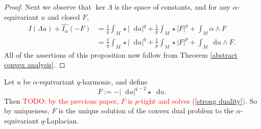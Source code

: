 \documentclass[reqno,11pt]{amsart}
\newcommand{\RR}{\mathbf{R}}
\newcommand{\Torus}{\mathbf T}
\newcommand*\dif{\mathop{}\!\mathrm{d}}
\theoremstyle{definition}
\newtheorem{definition}[theorem]{Definition}
\numberwithin{equation}{section}
\newcommand\todo[1]{\textcolor{red}{TODO: #1}}
\begin{document}
\begin{proof}
Next we observe that $\ker \Lambda$ is the space of constants, and for any $\alpha$-equivariant $u$ and closed $F$,
\begin{align*}
I(\Lambda u) + \widehat{I_\alpha}(-F)
&= \frac{1}{q} \int_M \star |\dif u|^q + \frac{1}{p} \int_M \star |F|^p + \int_M \alpha \wedge F \\
&= \frac{1}{q} \int_M \star |\dif u|^q + \frac{1}{p} \int_M \star |F|^p + \int_M \dif u \wedge F.
\end{align*}
All of the assertions of this proposition now follow from Theorem \ref{abstract convex analysis}.
\end{proof}

Let $u$ be $\alpha$-equivariant $q$-harmonic, and define
\begin{equation}\label{dual solution}
	F := - |\dif u|^{q - 2} \star \dif u.
\end{equation}
Then \todo{by the previous paper, $F$ is $p$-tight and solves (\ref{strong duality})}.
So by uniqueness, $F$ is the unique solution of the convex dual problem to the $\alpha$-equivariant $q$-Laplacian.



\end{document}
